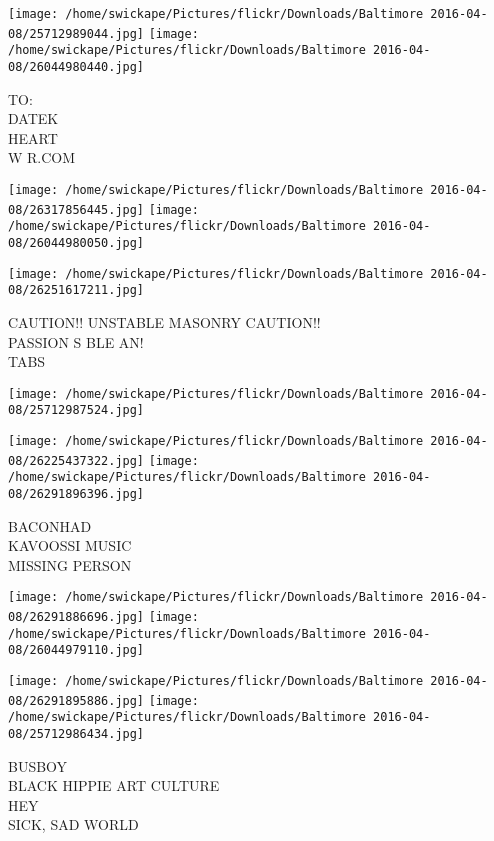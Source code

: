 \documentclass[10pt,letterpaper]{article}
\begin{document}
\texttt{[image: /home/swickape/Pictures/flickr/Downloads/Baltimore 2016-04-08/25712989044.jpg]}
\texttt{[image: /home/swickape/Pictures/flickr/Downloads/Baltimore 2016-04-08/26044980440.jpg]}

TO:\\
DATEK\\
HEART\\
W R.COM\\
\pagebreak

\texttt{[image: /home/swickape/Pictures/flickr/Downloads/Baltimore 2016-04-08/26317856445.jpg]}
\texttt{[image: /home/swickape/Pictures/flickr/Downloads/Baltimore 2016-04-08/26044980050.jpg]}

\texttt{[image: /home/swickape/Pictures/flickr/Downloads/Baltimore 2016-04-08/26251617211.jpg]}

CAUTION!! UNSTABLE MASONRY CAUTION!!\\
PASSION S BLE AN!\\
TABS\\
\pagebreak

\texttt{[image: /home/swickape/Pictures/flickr/Downloads/Baltimore 2016-04-08/25712987524.jpg]}

\vspace{0.25in}
\texttt{[image: /home/swickape/Pictures/flickr/Downloads/Baltimore 2016-04-08/26225437322.jpg]}
\texttt{[image: /home/swickape/Pictures/flickr/Downloads/Baltimore 2016-04-08/26291896396.jpg]}

BACONHAD\\
KAVOOSSI MUSIC\\
MISSING PERSON\\
\pagebreak

\texttt{[image: /home/swickape/Pictures/flickr/Downloads/Baltimore 2016-04-08/26291886696.jpg]}
\texttt{[image: /home/swickape/Pictures/flickr/Downloads/Baltimore 2016-04-08/26044979110.jpg]}

\texttt{[image: /home/swickape/Pictures/flickr/Downloads/Baltimore 2016-04-08/26291895886.jpg]}
\texttt{[image: /home/swickape/Pictures/flickr/Downloads/Baltimore 2016-04-08/25712986434.jpg]}

BUSBOY\\
BLACK HIPPIE ART CULTURE\\
HEY\\
SICK, SAD WORLD\\
\pagebreak
\end{document}
